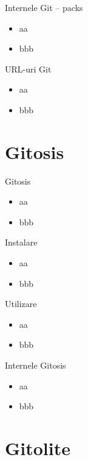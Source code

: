 \documentclass{beamer}
\begin{document}
\begin{frame}{Internele Git -- packs}
	\begin{itemize}
		\item aa
		\item bbb
	\end{itemize}
\end{frame}

\begin{frame}{URL-uri Git}
	\begin{itemize}
		\item aa
		\item bbb
	\end{itemize}
\end{frame}

\section{Gitosis}

\frame{\tableofcontents[currentsection]}

\begin{frame}{Gitosis}
	\begin{itemize}
		\item aa
		\item bbb
	\end{itemize}
\end{frame}

\begin{frame}{Instalare}
	\begin{itemize}
		\item aa
		\item bbb
	\end{itemize}
\end{frame}

\begin{frame}{Utilizare}
	\begin{itemize}
		\item aa
		\item bbb
	\end{itemize}
\end{frame}

\begin{frame}{Internele Gitosis}
	\begin{itemize}
		\item aa
		\item bbb
	\end{itemize}
\end{frame}

\section{Gitolite}
\end{document}
